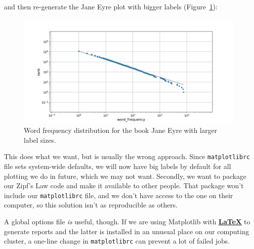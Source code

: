 \documentclass[
]{krantz}
\makeatletter
\newenvironment{Shaded}{\begin{snugshade}}{\end{snugshade}}
\newcommand{\BuiltInTok}[1]{#1}
\newcommand{\NormalTok}[1]{#1}
\newcommand{\OperatorTok}[1]{\textcolor[rgb]{0.81,0.36,0.00}{\textbf{#1}}}
\newenvironment{kframe}{%
\medskip{}
\setlength{\fboxsep}{.8em}
 \def\at@end@of@kframe{}%
 \ifinner\ifhmode%
  \def\at@end@of@kframe{\end{minipage}}%
  \begin{minipage}{\columnwidth}%
 \fi\fi%
 \def\FrameCommand##1{\hskip\@totalleftmargin \hskip-\fboxsep
 \colorbox{shadecolor}{##1}\hskip-\fboxsep
     \hskip-\linewidth \hskip-\@totalleftmargin \hskip\columnwidth}%
 \MakeFramed {\advance\hsize-\width
   \@totalleftmargin\z@ \linewidth\hsize
   \@setminipage}}%
 {\par\unskip\endMakeFramed%
 \at@end@of@kframe}
\renewenvironment{Shaded}{\begin{kframe}}{\end{kframe}}
\newcommand{\gref}[2]{\hyperlink{#2}{\textbf{#1}}}
\makeatother
\begin{document}
and then re-generate the Jane Eyre plot with bigger labels
(Figure~\ref{fig:configuration-jane-eyre-big-labels}):

\begin{Shaded}
\end{Shaded}

\begin{figure}

{\centering \includegraphics[width=1\linewidth]{figures/config/jane-eyre-big-labels} 

}

\caption{Word frequency distribution for the book Jane Eyre with larger label sizes.}\label{fig:configuration-jane-eyre-big-labels}
\end{figure}

This does what we want,
but is usually the wrong approach.
Since \texttt{matplotlibrc} file sets system-wide defaults,
we will now have big labels by default for all plotting we do in future,
which we may not want.
Secondly,
we want to package our Zipf's Law code and make it available to other people.
That package won't include our \texttt{matplotlibrc} file,
and we don't have access to the one on their computer,
so this solution isn't as reproducible as others.

A global options file \emph{is} useful, though.
If we are using Matplotlib with \gref{LaTeX}{latex} to generate reports
and the latter is installed in an unusual place on our computing cluster,
a one-line change in \texttt{matplotlibrc} can prevent a lot of failed jobs.
\end{document}
